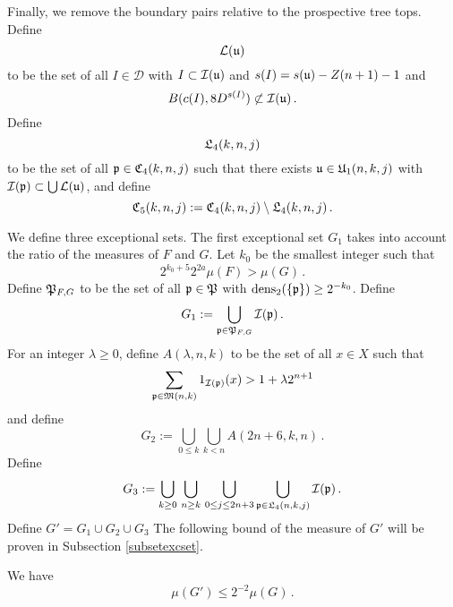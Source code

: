Finally, we remove the boundary pairs relative to the prospective tree tops. Define
\begin{equation}
    \label{eq L def}
    \mathcal{L}(\mathfrak u)
\end{equation}
to be the set of all $I \in \mathcal{D}$ with $I \subset \mathcal{I}(\mathfrak u)$ and $s(I) = s(\mathfrak u) - Z(n+1) - 1$ and
\begin{equation}
    B(c(I), 8 D^{s(I)})\not \subset \mathcal{I}(\mathfrak u)\, .
\end{equation}
Define
\begin{equation}
    \label{eq L4 def}
    \mathfrak L_4(k,n,j)
\end{equation}
to be the set of all $\mathfrak p\in \mathfrak C_4(k,n,j)$ such that there exists
$\mathfrak u\in \mathfrak U_1(n,k,j)$
with $\mathcal{I}(\mathfrak p) \subset \bigcup \mathcal{L}(\mathfrak u)$, and define
\begin{equation}\label{defc5}
\mathfrak C_5(k,n,j):=\mathfrak C_4(k,n,j)
    \setminus \mathfrak L_4(k,n,j)\, .
\end{equation}


We define three exceptional sets.
The first exceptional set $G_1$ takes into account the ratio of the measures of $F$ and $G$.
Let $k_0$ be the smallest integer such that 
\begin{equation}
2^{k_0+5}2^{2a} \mu(F)> \mu(G)\,.
\end{equation}
Define $\mathfrak P_{F,G}$ to be the set of all $\mathfrak p\in \mathfrak P$
with $\operatorname{\operatorname{dens}}_2(\{\mathfrak p\})\ge 2^{-k_0}$. Define
\begin{equation}\label{definegone}
    G_1:=\bigcup_{\mathfrak p\in \mathfrak P_{F,G} }\mathcal{I}(\mathfrak p)\, .
\end{equation}
For an integer $\lambda\ge 0$, define  $A(\lambda,n,k)$ to be the set  of all $x\in X$ such that
\begin{equation}
    \label{eq Aoverlap def}
    \sum_{\mathfrak p \in \mathfrak{M}(n,k)}1_{\mathcal{I}(\mathfrak p)}(x)>1+\lambda 2^{n+1}
\end{equation}
and define
\begin{equation}\label{definegone2}
    G_2:=
\bigcup_{0\le  k}\bigcup_{k< n}
A(2n+6,k,n)\, .
\end{equation}
Define
    \begin{equation}\label{defineg3}
        G_3 :=
        \bigcup_{k\ge 0}\, \bigcup_{n \geq k}\,
        \bigcup_{0\le j\le 2n+3}
        \bigcup_{\mathfrak p \in \mathfrak L_4 (n,k,j)}
        \mathcal{I}(\mathfrak p)\, .
        \end{equation}
Define $G'=G_1\cup G_2 \cup G_3$
The following bound of the measure of $G'$ will be proven in
Subsection \ref{subsetexcset}.
\begin{lemma}\label{allgbound}
We have
\begin{equation}
    \mu(G')\le 2^{-2}\mu(G)\, .
\end{equation}
\end{lemma}

